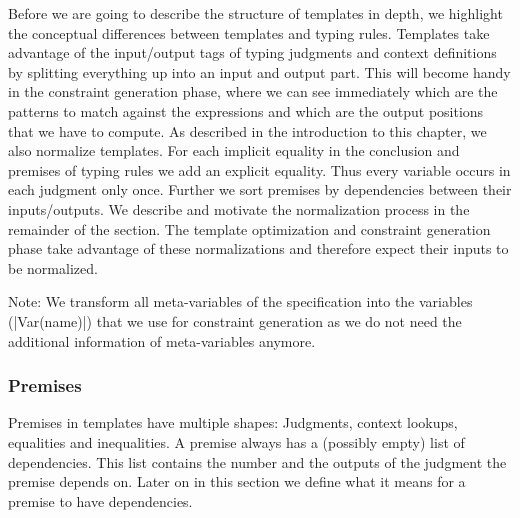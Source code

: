 Before we are going to describe the structure of templates in depth,
we highlight the conceptual differences between templates and typing
rules. Templates take advantage of the input/output tags of typing
judgments and context definitions by splitting everything up into an
input and output part. This will become handy in the constraint
generation phase, where we can see immediately which are the patterns
to match against the expressions and which are the output positions
that we have to compute. As described in the introduction to this
chapter, we also normalize templates. For each implicit equality in
the conclusion and premises of typing rules we add an explicit
equality. Thus every variable occurs in each judgment only
once. Further we sort premises by dependencies between their
inputs/outputs. We describe and motivate the normalization process in
the remainder of the section. The template optimization and constraint
generation phase take advantage of these normalizations and therefore
expect their inputs to be normalized.

Note: We transform all meta-variables of the specification into the
variables (\code|Var(name)|) that we use for constraint generation as
we do not need the additional information of meta-variables anymore.

\subsubsection{Premises}
Premises in templates have multiple shapes: Judgments, context
lookups, equalities and inequalities. A premise always has a (possibly
empty) list of dependencies. This list contains the number and the
outputs of the judgment the premise depends on. Later on in this
section we define what it means for a premise to have dependencies.

